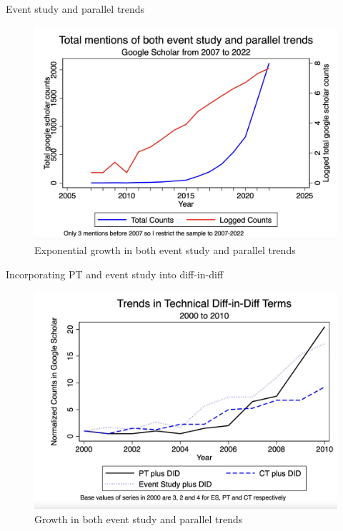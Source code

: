 \documentclass{beamer}
\begin{document}
\begin{frame}{Event study and parallel trends}

	\begin{figure}
	\caption{Exponential growth in both event study and parallel trends}
	\includegraphics[scale=0.2]{./lecture_includes/event_pt.png}
	\end{figure}

\end{frame}




\begin{frame}{Incorporating PT and event study into diff-in-diff}

	\begin{figure}
	\caption{Growth in both event study and parallel trends}
	\includegraphics[scale=0.2]{./lecture_includes/espt_2}
	\end{figure}


\end{frame}
\end{document}
